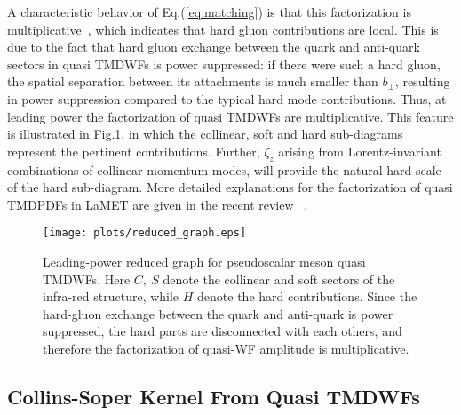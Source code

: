 \documentclass[prd,aps,twocolumn,preprintnumbers, showpacs, nofootinbib,superscriptaddress,notitlepage]{revtex4-1}
\begin{document}
A characteristic behavior of Eq.(\ref{eq:matching}) is that this factorization is multiplicative~\cite{Ji:2020ect}, which indicates that hard gluon contributions are local. This is due to the fact that hard gluon exchange between  the quark and anti-quark  sectors in quasi TMDWFs is power suppressed: if there were such a hard gluon, the spatial separation between its attachments  is much smaller than $b_{\perp}$, resulting in power suppression compared to the typical hard mode contributions.  
Thus, at leading power the factorization of quasi TMDWFs are multiplicative. This feature  is illustrated in Fig.\ref{fig:reduced_graph}, in which the collinear, soft and hard sub-diagrams represent the pertinent  contributions. Further, $\zeta_z$ arising from   Lorentz-invariant combinations of collinear momentum modes, will provide the natural hard scale of the hard sub-diagram. More detailed explanations for the factorization of quasi TMDPDFs in LaMET are given in the recent review~ \cite{Ji:2019ewn}. 


\begin{figure}
\centering
\texttt{[image: plots/reduced\_graph.eps]}
\caption{Leading-power reduced graph for pseudoscalar meson quasi TMDWFs. Here $C, ~S$ denote the collinear and soft sectors of the infra-red structure, while $H$ denote the hard contributions. Since the hard-gluon exchange between the quark and anti-quark is power suppressed, the hard parts are disconnected with each others, and therefore the factorization of quasi-WF amplitude is multiplicative.  }
\label{fig:reduced_graph}
\end{figure}




\subsection{Collins-Soper Kernel From Quasi TMDWFs}\label{sec:extractingCSkernel}
\end{document}
